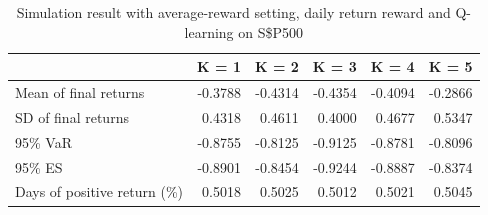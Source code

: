 \documentclass{article}
\begin{document}
\begin{table}[H]
\centering
\begin{tabular}{|l|r|r|r|r|r|} 
\hline
                             & \multicolumn{1}{l|}{K = 1} & \multicolumn{1}{l|}{K = 2} & \multicolumn{1}{l|}{K = 3} & \multicolumn{1}{l|}{K = 4} & \multicolumn{1}{l|}{K = 5}  \\ 
\hline
Mean of final returns        & -0.3788                    & -0.4314                    & -0.4354                    & -0.4094                    & -0.2866                     \\ 
\hline
SD of final returns          & 0.4318                     & 0.4611                     & 0.4000                     & 0.4677                     & 0.5347                      \\ 
\hline
95\% VaR                     & -0.8755                    & -0.8125                    & -0.9125                    & -0.8781                    & -0.8096                     \\ 
\hline
95\% ES                      & -0.8901                    & -0.8454                    & -0.9244                    & -0.8887                    & -0.8374                     \\ 
\hline
Days of positive return (\%) & 0.5018                     & 0.5025                     & 0.5012                     & 0.5021                     & 0.5045                      \\
\hline
\end{tabular}
\caption{Simulation result with average-reward setting, daily return reward and Q-learning on S\$P500}
\label{table20}
\end{table}
\end{document}
